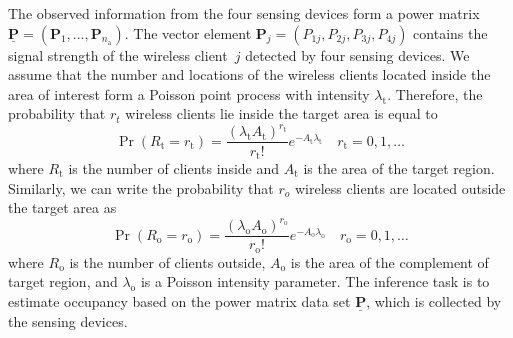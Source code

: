 The observed information from the four sensing devices form a power matrix $\underline{\mathbf{P}} = (\mathbf{P}_1, \ldots, \mathbf{P}_{n_{\mathrm{a}}})$.
The vector element $\mathbf{P}_j = (P_{1j}, P_{2j},P_{3j},P_{4j})$ contains the signal strength of the wireless client~$j$ detected by four sensing devices.
We assume that the number and locations of the wireless clients located inside the area of interest form a Poisson point process with intensity $\lambda_{\mathrm{t}}$.
Therefore, the probability that $r_{t}$ wireless clients lie inside the target area is equal to
\begin{equation*}
\Pr ( R_{\mathrm{t}} = r_{\mathrm{t}} )
= \frac{(\lambda_{\mathrm{t}} A_{\mathrm{t}})^{r_{\mathrm{t}}}}
{r_{\mathrm{t}}!} e^{- A_{\mathrm{t}} \lambda_{\mathrm{t}}}
\quad r_{\mathrm{t}} = 0, 1, \ldots
\end{equation*}
where $R_{\mathrm{t}}$ is the number of clients inside and $A_{\mathrm{t}}$ is the area of the target region.
Similarly, we can write the probability that $r_{o}$ wireless clients are located outside the target area as
\begin{equation*}
\Pr ( R_{\mathrm{o}} = r_{\mathrm{o}} )
= \frac{(\lambda_{\mathrm{o}} A_{\mathrm{o}})^{r_{\mathrm{o}}}}
{r_{\mathrm{o}}!} e^{- A_{\mathrm{o}} \lambda_{\mathrm{o}}}
\quad r_{\mathrm{o}} = 0, 1, \ldots
\end{equation*}
where $R_{\mathrm{o}}$ is the number of clients outside, $A_{\mathrm{o}}$ is the area of the complement of target region, and $\lambda_{\mathrm{o}}$ is a Poisson intensity parameter.
The inference task is to estimate occupancy based on the power matrix data set $\underline{\mathbf{P}}$, which is collected by the sensing devices.


